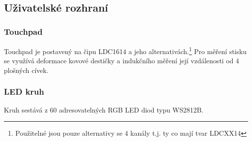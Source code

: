 \subsection{Uživatelské rozhraní}

\subsubsection{Touchpad}
Touchpad je postavený na čipu LDC1614 a jeho alternativách.\footnote{Použitelné jsou pouze alternativy se 4 kanály t.j. ty co mají tvar LDCXX14}
Pro měření stisku se využívá deformace kovové destičky a indukčního měření její vzdálenosti od 4 plošných cívek.

\subsubsection{LED kruh}
Kruh sestává z 60 adresovatelných RGB LED diod typu WS2812B.